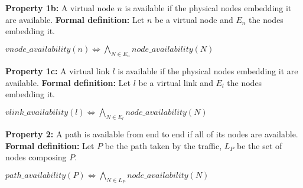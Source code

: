 \textbf{Property 1b:} A virtual node $n$ is available if the physical nodes embedding it are available.
\newline
\textbf{Formal definition:} Let $n$ be a virtual node and $E_n$ the nodes embedding it.

\begin{myformula}
$vnode\_availability(n) \Leftrightarrow \bigwedge\limits_{N \in E_n} node\_availability(N)$
\end{myformula}

\textbf{Property 1c:} A virtual link $l$ is available if the physical nodes embedding it are available.
\newline
\textbf{Formal definition:} Let $l$ be a virtual link and $E_l$ the nodes embedding it.

\begin{myformula}
$vlink\_availability(l) \Leftrightarrow \bigwedge\limits_{N \in E_l} node\_availability(N)$
\end{myformula}

\textbf{Property 2:} A path is available from end to end if all of its nodes are available.
\newline \textbf{Formal definition:} Let $P$ be the path taken by the traffic, $L_P$ be the set of nodes composing $P$. 

\begin{myformula}
$path\_availability(P)\Leftrightarrow\bigwedge\limits_{N \in L_P}node\_availability(N)$
\end{myformula}





